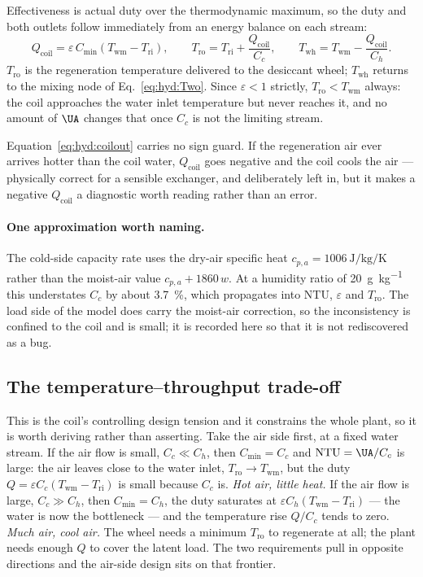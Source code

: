 Effectiveness is actual duty over the thermodynamic maximum, so the duty and both outlets
follow immediately from an energy balance on each stream:
\begin{equation}
Q_{\mathrm{coil}}=\varepsilon\,C_{\min}
\left(T_{\mathrm{wm}}-T_{\mathrm{ri}}\right),
\qquad
T_{\mathrm{ro}}=T_{\mathrm{ri}}+\frac{Q_{\mathrm{coil}}}{C_c},
\qquad
T_{\mathrm{wh}}=T_{\mathrm{wm}}-\frac{Q_{\mathrm{coil}}}{C_h} .
\label{eq:hyd:coilout}
\end{equation}
$T_{\mathrm{ro}}$ is the regeneration temperature delivered to the desiccant wheel;
$T_{\mathrm{wh}}$ returns to the mixing node of Eq.~\eqref{eq:hyd:Two}. Since $\varepsilon<1$
strictly, $T_{\mathrm{ro}}<T_{\mathrm{wm}}$ always: the coil approaches the water inlet
temperature but never reaches it, and no amount of $\UA$ changes that once $C_c$ is not the
limiting stream.

Equation~\eqref{eq:hyd:coilout} carries no sign guard. If the regeneration air ever arrives
hotter than the coil water, $Q_{\mathrm{coil}}$ goes negative and the coil cools the air ---
physically correct for a sensible exchanger, and deliberately left in, but it makes a negative
$Q_{\mathrm{coil}}$ a diagnostic worth reading rather than an error.

\paragraph{One approximation worth naming.} The cold-side capacity rate uses the dry-air
specific heat $c_{p,a}=\SI{1006}{\joule\per\kilogram\per\kelvin}$ rather than the moist-air
value $c_{p,a}+1860\,w$. At a humidity ratio of \SI{20}{\gram\per\kilogram} this understates
$C_c$ by about \SI{3.7}{\percent}, which propagates into $\mathrm{NTU}$, $\varepsilon$ and
$T_{\mathrm{ro}}$. The load side of the model does carry the moist-air correction, so the
inconsistency is confined to the coil and is small; it is recorded here so that it is not
rediscovered as a bug.

\subsection{The temperature--throughput trade-off}
\label{sec:hyd:tradeoff}

This is the coil's controlling design tension and it constrains the whole plant, so it is worth
deriving rather than asserting. Take the air side first, at a fixed water stream. If the air
flow is small, $C_c\ll C_h$, then
$C_{\min}=C_c$ and $\mathrm{NTU}=\UA/C_c$ is large: the air leaves close to the water inlet,
$T_{\mathrm{ro}}\to T_{\mathrm{wm}}$, but the duty $Q=\varepsilon
C_c(T_{\mathrm{wm}}-T_{\mathrm{ri}})$ is small because $C_c$ is. \emph{Hot air, little heat.}
If the air flow is large, $C_c\gg C_h$, then $C_{\min}=C_h$, the duty saturates at $\varepsilon
C_h(T_{\mathrm{wm}}-T_{\mathrm{ri}})$ --- the water is now the bottleneck --- and the
temperature rise $Q/C_c$ tends to zero. \emph{Much air, cool air.} The wheel needs a minimum
$T_{\mathrm{ro}}$ to regenerate at all; the plant needs enough $Q$ to cover the latent load.
The two requirements pull in opposite directions and the air-side design sits on that frontier.

